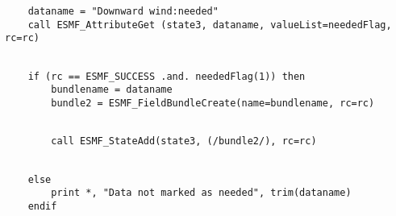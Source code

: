  \begin{verbatim}
    dataname = "Downward wind:needed"
    call ESMF_AttributeGet (state3, dataname, valueList=neededFlag, rc=rc)
 
\end{verbatim}
 

 \begin{verbatim}
    if (rc == ESMF_SUCCESS .and. neededFlag(1)) then
        bundlename = dataname
        bundle2 = ESMF_FieldBundleCreate(name=bundlename, rc=rc)
 
\end{verbatim}
 

 \begin{verbatim}
        call ESMF_StateAdd(state3, (/bundle2/), rc=rc)
 
\end{verbatim}
 

 \begin{verbatim}
    else
        print *, "Data not marked as needed", trim(dataname)
    endif
 
\end{verbatim}

\setlength{\parskip}{\oldparskip}
\setlength{\parindent}{\oldparindent}
\setlength{\baselineskip}{\oldbaselineskip}

